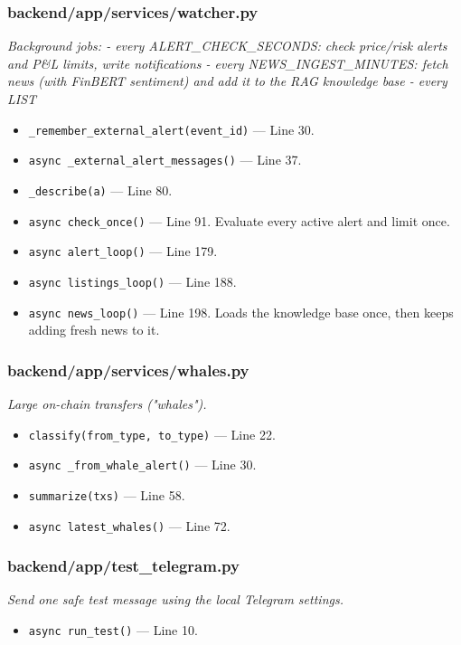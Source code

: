 \subsubsection*{backend/app/services/watcher.py}
\textit{Background jobs: - every ALERT\_CHECK\_SECONDS: check price/risk alerts and P\&L limits, write notifications - every NEWS\_INGEST\_MINUTES: fetch news (with FinBERT sentiment) and add it to the RAG knowledge base - every LIST}
\begin{itemize}[nosep,leftmargin=1.5em]
\item \texttt{\_\allowbreak{}remember\_\allowbreak{}external\_\allowbreak{}alert(\allowbreak{}event\_\allowbreak{}id)} --- Line 30.
\item \texttt{async \_\allowbreak{}external\_\allowbreak{}alert\_\allowbreak{}messages(\allowbreak{})} --- Line 37.
\item \texttt{\_\allowbreak{}describe(\allowbreak{}a)} --- Line 80.
\item \texttt{async check\_\allowbreak{}once(\allowbreak{})} --- Line 91. Evaluate every active alert and limit once.
\item \texttt{async alert\_\allowbreak{}loop(\allowbreak{})} --- Line 179.
\item \texttt{async listings\_\allowbreak{}loop(\allowbreak{})} --- Line 188.
\item \texttt{async news\_\allowbreak{}loop(\allowbreak{})} --- Line 198. Loads the knowledge base once, then keeps adding fresh news to it.
\end{itemize}
\subsubsection*{backend/app/services/whales.py}
\textit{Large on-chain transfers ("whales").}
\begin{itemize}[nosep,leftmargin=1.5em]
\item \texttt{classify(\allowbreak{}from\_\allowbreak{}type,\allowbreak{} to\_\allowbreak{}type)} --- Line 22.
\item \texttt{async \_\allowbreak{}from\_\allowbreak{}whale\_\allowbreak{}alert(\allowbreak{})} --- Line 30.
\item \texttt{summarize(\allowbreak{}txs)} --- Line 58.
\item \texttt{async latest\_\allowbreak{}whales(\allowbreak{})} --- Line 72.
\end{itemize}
\subsubsection*{backend/app/test\_telegram.py}
\textit{Send one safe test message using the local Telegram settings.}
\begin{itemize}[nosep,leftmargin=1.5em]
\item \texttt{async run\_\allowbreak{}test(\allowbreak{})} --- Line 10.
\end{itemize}

